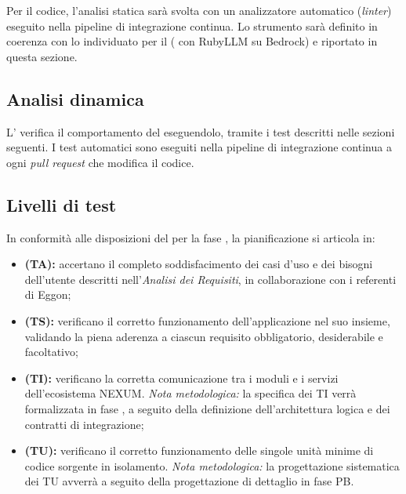 \documentclass[documento]{gpt}
\begin{document}
Per il codice, l'analisi statica sarà svolta con un analizzatore automatico (\textit{linter}) eseguito nella pipeline di integrazione continua. Lo strumento sarà definito in coerenza con lo  individuato per il  ( con RubyLLM su  Bedrock) e riportato in questa sezione.

\subsection{Analisi dinamica}
L' verifica il comportamento del  eseguendolo, tramite i test descritti nelle sezioni seguenti. I test automatici sono eseguiti nella pipeline di integrazione continua a ogni \textit{pull request} che modifica il codice.

\subsection{Livelli di test}
In conformità alle disposizioni del  per la fase , la pianificazione si articola in:
\begin{itemize}
    \item \textbf{ (TA):} accertano il completo soddisfacimento dei casi d'uso e dei bisogni dell'utente descritti nell'\textit{Analisi dei Requisiti}, in collaborazione con i referenti di Eggon;
    \item \textbf{ (TS):} verificano il corretto funzionamento dell'applicazione nel suo insieme, validando la piena aderenza a ciascun requisito obbligatorio, desiderabile e facoltativo;
    \item \textbf{ (TI):} verificano la corretta comunicazione tra i moduli  e i servizi dell'ecosistema NEXUM. \textit{Nota metodologica:} la specifica dei TI verrà formalizzata in fase , a seguito della definizione dell'architettura logica e dei contratti di integrazione;
    \item \textbf{ (TU):} verificano il corretto funzionamento delle singole unità minime di codice sorgente in isolamento. \textit{Nota metodologica:} la progettazione sistematica dei TU avverrà a seguito della progettazione di dettaglio in fase PB.
\end{itemize}
\end{document}
